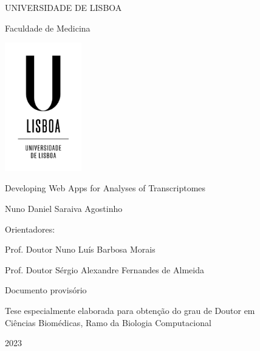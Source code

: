 \documentclass[12pt, twoside]{report}
\begin{document}
\begin{titlepage}
    \begin{center}
        \vspace*{-.2cm}
        UNIVERSIDADE DE LISBOA
        
        Faculdade de Medicina
        
        \includegraphics[width=0.25\textwidth]{images/logo/ulisboa-only}
        
        \vspace{1.8cm}
        Developing Web Apps for Analyses of Transcriptomes

        \vspace{1.1cm}        
            
        \vspace{0.9cm}            
        Nuno Daniel Saraiva Agostinho
    \end{center}

    \vspace{0.9cm}
    Orientadores:

      Prof. Doutor Nuno Luís Barbosa Morais

      Prof. Doutor Sérgio Alexandre Fernandes de Almeida
    
    \vspace{1.6cm}
    \begin{center}
        Documento provisório
        
        Tese especialmente elaborada para obtenção do grau de Doutor em\\
        Ciências Biomédicas, Ramo da Biologia Computacional
            
        \vfill
        2023
        \vspace{.7cm}
    \end{center}
\end{titlepage}
\end{document}

